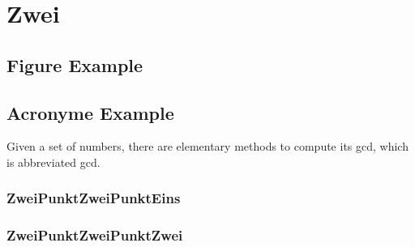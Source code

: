 
\section{Zwei}

\subsection{Figure Example}


\subsection{Acronyme Example}

Given a set of numbers, there are elementary methods to compute its \acrlong{gcd}, which is abbreviated \acrshort{gcd}. \parencite[s.][]{2020_latex}

\noindent \subsubsection{ZweiPunktZweiPunktEins}

\noindent \subsubsection{ZweiPunktZweiPunktZwei}
